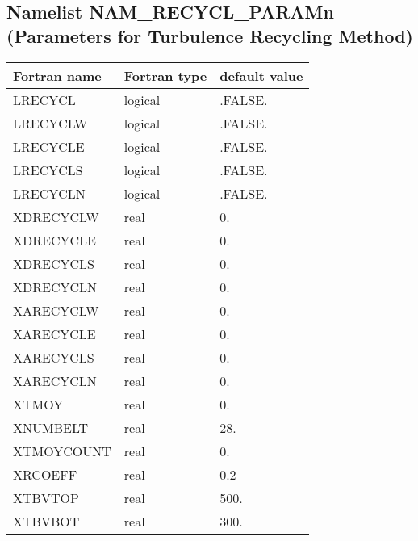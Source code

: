 \subsection{Namelist NAM\_RECYCL\_PARAMn (Parameters for Turbulence Recycling Method)}
\begin{center}
\begin{tabular}{|l|l|l| }
\hline 
 Fortran name        & Fortran type  & default value \\
\hline
LRECYCL              & logical       & .FALSE.       \\
LRECYCLW             & logical       & .FALSE.       \\
LRECYCLE             & logical       & .FALSE.       \\
LRECYCLS             & logical       & .FALSE.       \\
LRECYCLN             & logical       & .FALSE.       \\
XDRECYCLW            & real          & 0.            \\
XDRECYCLE            & real          & 0.            \\
XDRECYCLS            & real          & 0.            \\
XDRECYCLN            & real          & 0.            \\
XARECYCLW            & real          & 0.            \\
XARECYCLE            & real          & 0.            \\
XARECYCLS            & real          & 0.            \\
XARECYCLN            & real          & 0.            \\
XTMOY                & real          & 0.            \\
XNUMBELT             & real          & 28.           \\
XTMOYCOUNT           & real          & 0.            \\
XRCOEFF              & real          & 0.2           \\
XTBVTOP              & real          & 500.          \\
XTBVBOT              & real          & 300.          \\
\hline
\end{tabular}
\end{center}


